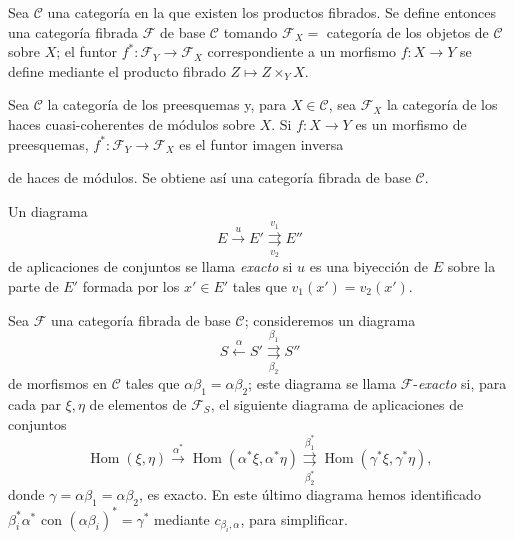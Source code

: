  Sea $\mathcal C$ una categoría en la que existen los
productos fibrados. Se define entonces una categoría fibrada $\mathcal F$ de
base $\mathcal C$ tomando $\mathcal F_X=$ categoría de los objetos de
$\mathcal C$ sobre $X$; el funtor
$f^*:\mathcal F_Y\longrightarrow\mathcal F_X$ correspondiente a un morfismo
$f:X\longrightarrow Y$ se define mediante el producto fibrado
$Z\longmapsto Z\times_YX$.

 Sea $\mathcal C$ la categoría de los preesquemas y, para
$X\in\mathcal C$, sea $\mathcal F_X$ la categoría de los haces
cuasi-coherentes de módulos sobre $X$. Si $f:X\longrightarrow Y$ es un morfismo
de preesquemas, $f^*:\mathcal F_Y\longrightarrow\mathcal F_X$ es el funtor
imagen inversa

de haces de módulos. Se obtiene así una categoría fibrada de base
$\mathcal C$.

 Un diagrama
\[
  E\xrightarrow{u}E'
  \overset{v_1}{\underset{v_2}{\rightrightarrows}}E''
\]
de aplicaciones de conjuntos se llama \emph{exacto} si $u$ es una biyección de
$E$ sobre la parte de $E'$ formada por los $x'\in E'$ tales que
$v_1(x')=v_2(x')$.

 Sea $\mathcal F$ una categoría fibrada de base
$\mathcal C$; consideremos un diagrama
\[
  \tag{+}
  S\xleftarrow{\alpha}S'
  \overset{\beta_1}{\underset{\beta_2}{\rightrightarrows}}S''
\]
de morfismos en $\mathcal C$ tales que
$\alpha\beta_1=\alpha\beta_2$; este diagrama se llama
$\mathcal F$-\emph{exacto} si, para cada par $\xi,\eta$ de elementos de
$\mathcal F_S$, el siguiente diagrama de aplicaciones de conjuntos
\[
  \tag{+'}
  \operatorname{Hom}(\xi,\eta)
  \xrightarrow{\alpha^*}
  \operatorname{Hom}(\alpha^*\xi,\alpha^*\eta)
  \overset{\beta_1^*}{\underset{\beta_2^*}{\rightrightarrows}}
  \operatorname{Hom}(\gamma^*\xi,\gamma^*\eta),
\]
donde $\gamma=\alpha\beta_1=\alpha\beta_2$, es exacto. En este último diagrama
hemos identificado $\beta_i^*\alpha^*$ con
$(\alpha\beta_i)^*=\gamma^*$ mediante $c_{\beta_i,\alpha}$, para simplificar.

